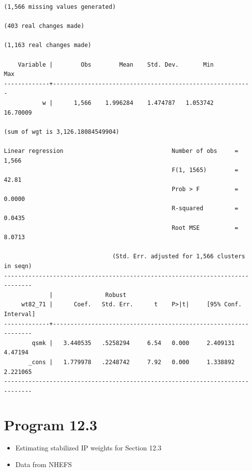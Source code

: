 \documentclass[
  10pt,
]{book}
\providecommand{\tightlist}{%
  \setlength{\itemsep}{0pt}\setlength{\parskip}{0pt}}
\begin{document}
\begin{verbatim}
(1,566 missing values generated)

(403 real changes made)

(1,163 real changes made)

    Variable |        Obs        Mean    Std. Dev.       Min        Max
-------------+---------------------------------------------------------
           w |      1,566    1.996284    1.474787   1.053742   16.70009

(sum of wgt is 3,126.18084549904)

Linear regression                               Number of obs     =      1,566
                                                F(1, 1565)        =      42.81
                                                Prob > F          =     0.0000
                                                R-squared         =     0.0435
                                                Root MSE          =     8.0713

                               (Std. Err. adjusted for 1,566 clusters in seqn)
------------------------------------------------------------------------------
             |               Robust
     wt82_71 |      Coef.   Std. Err.      t    P>|t|     [95% Conf. Interval]
-------------+----------------------------------------------------------------
        qsmk |   3.440535   .5258294     6.54   0.000     2.409131     4.47194
       _cons |   1.779978   .2248742     7.92   0.000     1.338892    2.221065
------------------------------------------------------------------------------
\end{verbatim}

\hypertarget{program-12.3-1}{%
\section{Program 12.3}\label{program-12.3-1}}

\begin{itemize}
\tightlist
\item
  Estimating stabilized IP weights for Section 12.3
\item
  Data from NHEFS
\end{itemize}
\end{document}

